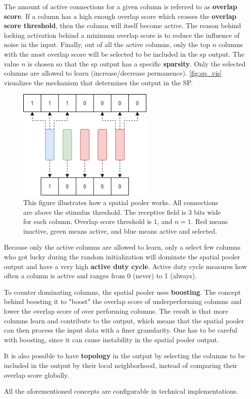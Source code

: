 The amount of active connections for a given column is referred to as \textbf{overlap score}. If a column has a high enough overlap score which crosses the \textbf{overlap score threshold}, then the column will itself become active. The reason behind locking activation behind a minimum overlap score is to reduce the influence of noise in the input. Finally, out of all the active columns, only the top $n$ columns with the most overlap score will be selected to be included in the \gls*{sp} output. The value $n$ is chosen so that the \gls*{sp} output has a specific \textbf{sparsity}. Only the selected columns are allowed to learn (increase/decrease permanence). \autoref{fig:sp_vis} visualizes the mechanism that determines the output in the SP.
\par
\begin{figure}[H]
    \centering
    \includegraphics[width=0.6\textwidth]{resources/related_works/sp_vis.png}
    \caption{ This figure illustrates how a spatial pooler works. All connections are above the stimulus threshold. The receptive field is 3 bits wide for each column. Overlap score threshold is $1$, and $n=1$. Red means inactive, green means active, and blue means active and selected.}
    \label{fig:sp_vis}
\end{figure}
Because only the active columns are allowed to learn, only a select few columns who got lucky during the random initialization will dominate the spatial pooler output and have a very high \textbf{active duty cycle}. Active duty cycle measures how often a column is active and ranges from 0 (never) to 1 (always). \par
To counter dominating columns, the spatial pooler uses \textbf{boosting}.
The concept behind boosting it to "boost" the overlap score of underperforming columns and lower the overlap score of over performing columns. The result is that more columns learn and contribute to the output, which means that the spatial pooler can then process the input data with a finer granularity. One has to be careful with boosting, since it can cause instability in the spatial pooler output.
\par
It is also possible to have \textbf{topology} in the output by selecting the columns to be included in the output by their local neighborhood, instead of comparing their overlap score globally.
\par
All the aforementioned concepts are configurable in technical implementations.

